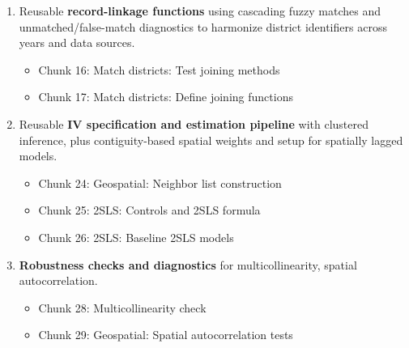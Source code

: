 \documentclass[letterpaper,12pt]{article}
\begin{document}
\begin{enumerate}
\item[80-88:] 
Reusable \textbf{record-linkage functions} using cascading fuzzy matches and unmatched/false-match diagnostics to harmonize district identifiers across years and data sources.
\vspace{-2mm}
\begin{itemize}
\item Chunk 16: Match districts: Test joining methods
\vspace{-1mm}
\item Chunk 17: Match districts: Define joining functions
\end{itemize}
\vspace{-2mm}

\item[105-107:] Reusable \textbf{IV specification and estimation pipeline} with clustered inference, plus contiguity-based spatial weights and setup for spatially lagged models.
\vspace{-2mm}
\begin{itemize}
\item Chunk 24: Geospatial: Neighbor list construction
\vspace{-1mm}
\item Chunk 25: 2SLS: Controls and 2SLS formula
\vspace{-1mm}
\item Chunk 26: 2SLS: Baseline 2SLS models
\end{itemize}
\vspace{-2mm}

\item[111-112:] \textbf{Robustness checks and diagnostics} for multicollinearity, spatial autocorrelation.
\vspace{-2mm}
\begin{itemize}
\item Chunk 28: Multicollinearity check
\vspace{-1mm}
\item Chunk 29: Geospatial: Spatial autocorrelation tests
\end{itemize}
\vspace{-2mm}

\end{enumerate}
\end{document}
